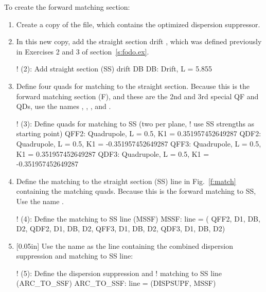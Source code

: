 \documentclass{hitec}     %
\begin{document}
{To create the forward matching section:
\begin{enumerate}[leftmargin=*]
%
\item Create a copy of the  file, which contains the optimized dispersion suppressor.
%
\item In this new copy, add the straight section drift , which was defined previously in Exercises 2 and 3 of section~\ref{s:fodo.ex}.
\begin{code}
! (2): Add straight section (SS) drift DB
DB: Drift, L = 5.855
\end{code}    
%
\item Define four quads for matching to the straight section. Because this is the forward matching section (F), and these are the 2nd and 3rd special QF and QDs, use the names , , , and .
%
\begin{code}
! (3): Define quads for matching to SS (two per plane, 
!      use SS strengths as starting point)
QFF2: Quadrupole, L = 0.5, K1 = 0.351957452649287
QDF2: Quadrupole, L = 0.5, K1 = -0.351957452649287
QFF3: Quadrupole, L = 0.5, K1 = 0.351957452649287
QDF3: Quadrupole, L = 0.5, K1 = -0.351957452649287
\end{code}
%
\item Define the matching to the straight section (SS) line in Fig.~\ref{f:match} containing the matching quads. Because this is the forward matching to SS, Use the name . 
\begin{code} 
! (4): Define the matching to SS line (MSSF)
MSSF: line = ( QFF2, D1, DB, D2, QDF2, D1, DB, D2,  
               QFF3, D1, DB, D2, QDF3, D1, DB, D2)
\end{code}
%
\item 
{}[0.05in]
%
Use the name  as the line containing
the combined dispersion suppression and matching to SS line:
\begin{code}
! (5): Define the dispersion suppression and
!       matching to SS line (ARC_TO_SSF)
ARC_TO_SSF: line = (DISPSUPF, MSSF)


\end{code}
\end{enumerate}}
\end{document}
